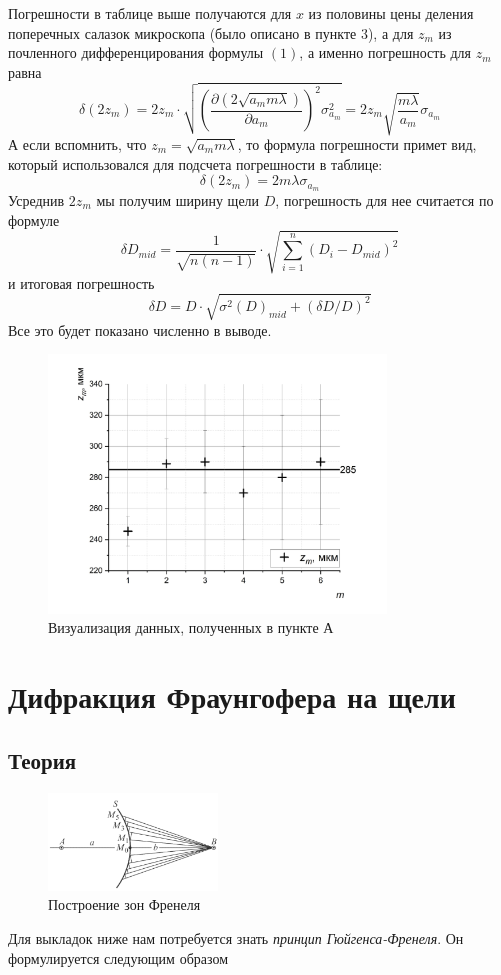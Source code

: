 \documentclass[a4paper, 12pt]{article}%
\begin{document}
\begin{enumerate}
Погрешности в таблице выше получаются для $x$ из половины цены деления поперечных салазок микроскопа (было описано в пункте 3), а для $z_m$ из почленного дифференцирования формулы $(1)$, а именно погрешность для $z_m$ равна 
\[ \delta(2 z_m) = 2	z_m \cdot \sqrt{\left(\dfrac{\partial \left( 2\sqrt{a_mm\lambda} \right)}{\partial a_m}\right)^{2} \sigma_{a_m}^2} = 2 z_m \sqrt{\dfrac{m \lambda}{a_m}} \sigma_{a_m}\]
А если вспомнить, что $z_m = \sqrt{a_m m \lambda}$, то формула погрешности примет вид, который использовался для подсчета погрешности в таблице:
\[\delta(2z_m) = 2 m \lambda \sigma_{a_m}\]
Усреднив $2z_m$ мы получим ширину щели $D$, погрешность для нее считается по формуле 
\[\delta D_{mid} = \dfrac{1}{\sqrt{n(n-1)}} \cdot \sqrt{\sum\limits_{i = 1}^n\left(D_i - D_{mid}\right)^2}\]
и итоговая погрешность 
\[\delta D = D \cdot \sqrt{\sigma^2 (D)_{mid} + (\delta D/D)^2}\]
Все это будет показано численно в выводе.
\begin{figure}[h!]
\begin{center}
\includegraphics[width = 0.8\textwidth]{9.jpg}
\caption{Визуализация данных, полученных в пункте А}
\end{center}
\end{figure}
\end{enumerate}
\section{Дифракция Фраунгофера на щели}
\subsection*{Теория}
\begin{figure}
  \begin{center}
    \includegraphics[width = 0.4\textwidth]{2.png}
  \end{center}
  \caption{Построение зон Френеля}
\end{figure}
Для выкладок ниже нам потребуется знать \textit{принцип Гюйгенса-Френеля}. Он формулируется следующим образом 
\end{document}
